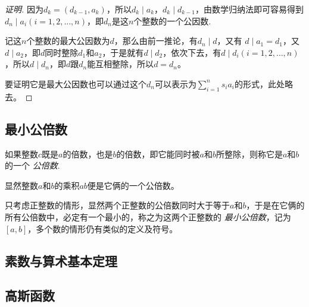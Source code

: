 \begin{proof}[证明]
  因为$d_k=(d_{k-1},a_k)$，所以$d_k \mid a_k$，$d_k \mid d_{k-1}$，由数学归纳法即可容易得到$d_n \mid a_i(i=1,2,\dots,n)$，即$d_n$是这$n$个整数的一个公因数.

  记这$n$个整数的最大公因数为$d$，那么由前一推论，有$d_n \mid d$，又有 $d \mid a_1=d_1$，又$d \mid a_2$，即$d$同时整除$d_1$和$a_2$，于是就有$d \mid d_2$，依次下去，有$d \mid d_i(i=1,2,\ldots,n)$，所以$d \mid d_n$，即$d$跟$d_n$能互相整除，所以$d=d_n$。

  要证明它是最大公因数也可以通过这个$d_n$可以表示为$\sum_{i=1}^n s_ia_i$的形式，此处略去。
\end{proof}

\subsection{最小公倍数}
\label{sec:least-common-multiple}

\begin{definition}
  如果整数$c$既是$a$的倍数，也是$b$的倍数，即它能同时被$a$和$b$所整除，则称它是$a$和$b$的一个 \emph{公倍数}.
\end{definition}
显然整数$a$和$b$的乘积$ab$便是它俩的一个公倍数。

只考虑正整数的情形，显然两个正整数的公倍数同时大于等于$a$和$b$，于是在它俩的所有公倍数中，必定有一个最小的，称之为这两个正整数的 \emph{最小公倍数}，记为$[a,b]$，多个数的情形仍有类似的定义及符号。

\subsection{素数与算术基本定理}
\label{sec:prime-number-and-fundamental-theorem-of-arithmetic}

\subsection{高斯函数}
\label{sec:gauss-function}


